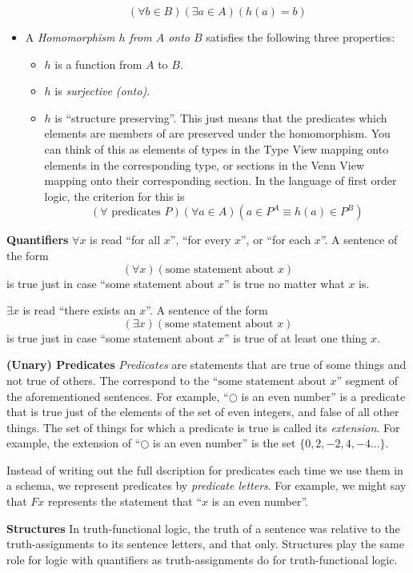 \begin{mdframed}[linewidth=1]
\begin{itemize}
        \[
             (\forall b \in B)(\exists a \in A)(h(a) = b)
         \] 
    \item A \emph{Homomorphism $h$ from $A$ onto $B$} satisfies the following three properties:
    \begin{itemize}
        \item $h$ is a function from $A$ to $B$.
        \item $h$ is \emph{surjective (onto)}. 
        \item $h$ is ``structure preserving''. This just means that the predicates which elements are members of are preserved under the homomorphism. You can think of this as elements of types in the Type View mapping onto elements in the corresponding type, or sections in the Venn View mapping onto their corresponding section. In the language of first order logic, the criterion for this is
        \[
            (\forall \text{ predicates }P)(\forall a \in A)(a \in P^A \equiv h(a)\in P^B)
        \]
    \end{itemize}

\end{itemize}

\textbf{Quantifiers}
$\forall x$ is read ``for all $x$'', ``for every $x$'', or ``for each $x$''. A sentence of the form $$(\forall x)(\text{some statement about }x)$$ is true just in case ``some statement about $x$'' is true no matter what $x$ is. 

$\exists x$ is read ``there exists an $x$''. A sentence of the form $$(\exists x)(\text{some statement about }x)$$ is true just in case ``some statement about $x$'' is true of at least one thing $x$. 

\textbf{(Unary) Predicates}
\emph{Predicates} are statements that are true of some things and not true of others. The correspond to the ``$\text{some statement about }x$'' segment of the aforementioned sentences. For example, ``$\bigcirc$ is an even number'' is a predicate that is true just of the elements of the set of even integers, and false of all other things. The set of things for which a predicate is true is called its \emph{extension}. For example, the extension of ``$\bigcirc$ is an even number'' is the set $\{0, 2, -2, 4, -4...\}$. 

Instead of writing out the full dscription for predicates each time we use them in a schema, we represent predicates by \emph{predicate letters}. For example, we might say that $Fx$ represents the statement that ``$x$ is an even number''.

\textbf{Structures}
In truth-functional logic, the truth of a sentence was relative to the truth-assignments to its sentence letters, and that only. Structures play the same role for logic with quantifiers as truth-assignments do for truth-functional logic. 
 

\end{mdframed}
